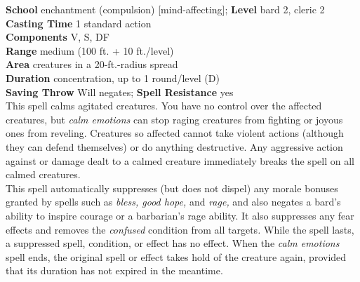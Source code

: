\textbf{School }enchantment (compulsion) [mind-affecting]; \textbf{Level} bard 2, cleric 2\\
\textbf{Casting Time} 1 standard action\\
\textbf{Components} V, S, DF\\
\textbf{Range }medium (100 ft. + 10 ft./level)\\
\textbf{Area} creatures in a 20-ft.-radius spread\\
\textbf{Duration} concentration, up to 1 round/level (D)\\
\textbf{Saving Throw }Will negates; \textbf{Spell Resistance} yes\\
This spell calms agitated creatures. You have no control over the affected creatures, but \textit{calm emotions }can stop raging creatures from fighting or joyous ones from reveling. Creatures so affected cannot take violent actions (although they can defend themselves) or do anything destructive. Any aggressive action against or damage dealt to a calmed creature immediately breaks the spell on all calmed creatures.\\
This spell automatically suppresses (but does not dispel) any morale bonuses granted by spells such as \textit{bless, good hope, }and \textit{rage, }and also negates a bard's ability to inspire courage or a barbarian's rage ability. It also suppresses any fear effects and removes the \textit{confused }condition from all targets\textit{. }While the spell lasts, a suppressed spell, condition, or effect has no effect. When the \textit{calm emotions }spell ends, the original spell or effect takes hold of the creature again, provided that its duration has not expired in the meantime.\\
